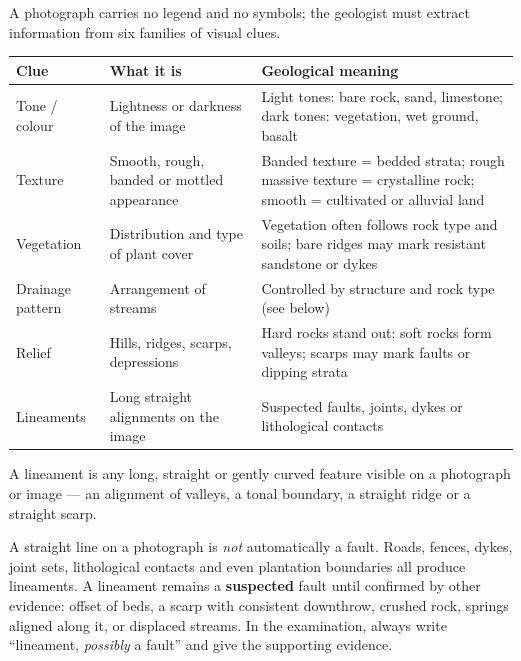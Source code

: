 \documentclass[11pt]{article}
\newcommand{\cle}[1]{{\popxbold\color{popdark}#1}}
\newcounter{popsec}
\newcounter{popsub}
\newcommand{\courssub}[1]{%
  \stepcounter{popsub}%
  \par\vspace{9pt}\noindent{\popxbold\fontsize{11.5}{13}\selectfont\color{popink}{\color{poporange}\thepopsec.\thepopsub}\hspace{6pt}#1}\par\nopagebreak\vspace{4pt}
}
\begin{document}
\courssub{Reading Photographic Clues}

A photograph carries no legend and no symbols; the geologist must extract information from six families of visual clues.

\begin{center}
\begin{tabularx}{\linewidth}{|l|X|X|}
\hline
\rowcolor{popblueL} \textbf{Clue} & \textbf{What it is} & \textbf{Geological meaning} \\
\hline
Tone / colour & Lightness or darkness of the image & Light tones: bare rock, sand, limestone; dark tones: vegetation, wet ground, basalt \\
\hline
Texture & Smooth, rough, banded or mottled appearance & Banded texture = bedded strata; rough massive texture = crystalline rock; smooth = cultivated or alluvial land \\
\hline
Vegetation & Distribution and type of plant cover & Vegetation often follows rock type and soils; bare ridges may mark resistant sandstone or dykes \\
\hline
Drainage pattern & Arrangement of streams & Controlled by structure and rock type (see below) \\
\hline
Relief & Hills, ridges, scarps, depressions & Hard rocks stand out; soft rocks form valleys; scarps may mark faults or dipping strata \\
\hline
Lineaments & Long straight alignments on the image & Suspected faults, joints, dykes or lithological contacts \\
\hline
\end{tabularx}
\end{center}

\begin{definition}[Lineament]
A \cle{lineament} is any long, straight or gently curved feature visible on a photograph or image — an alignment of valleys, a tonal boundary, a straight ridge or a straight scarp.
\end{definition}

\begin{attention}
A straight line on a photograph is \emph{not} automatically a fault. Roads, fences, dykes, joint sets, lithological contacts and even plantation boundaries all produce lineaments. A lineament remains a \textbf{suspected} fault until confirmed by other evidence: offset of beds, a scarp with consistent downthrow, crushed rock, springs aligned along it, or displaced streams. In the examination, always write ``lineament, \emph{possibly} a fault'' and give the supporting evidence.
\end{attention}
\end{document}
